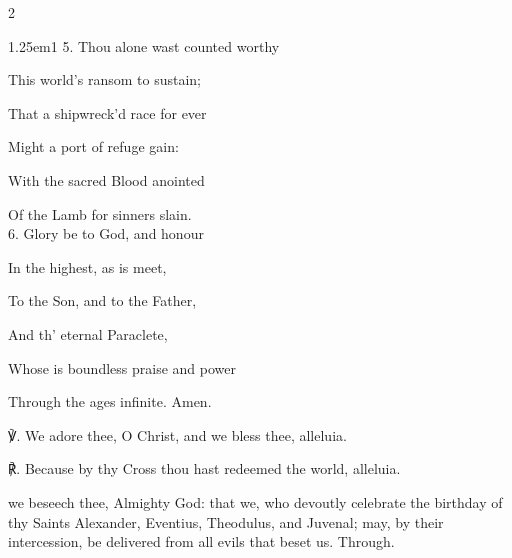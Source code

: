 \begin{paracol}{2}
\begin{hangparas}{1.25em}{1}
5. Thou alone wast counted worthy

This world's ransom to sustain;

That a shipwreck'd race for ever

Might a port of refuge gain:

With the sacred Blood anointed

Of the Lamb for sinners slain.\\

6. Glory be to God, and honour

In the highest, as is meet,

To the Son, and to the Father,

And th' eternal Paraclete,

Whose is boundless praise and power

Through the ages infinite. Amen.\\
\end{hangparas}

℣. We adore thee, O Christ, and we bless thee, alleluia.

℟. Because by thy Cross thou hast redeemed the world, alleluia.


\fussy	
\end{paracol}




\memorialCollect\label{AlexanderEtcCollect}
 we beseech thee, Almighty God: that we, who devoutly celebrate the birthday of thy Saints Alexander, Eventius, Theodulus, and Juvenal; may, by their intercession, be delivered from all evils that beset us. Through.




